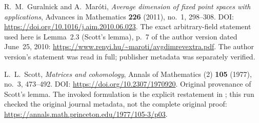 R.~M.~Guralnick and A.~Mar\'oti,
\emph{Average dimension of fixed point spaces with applications},
Advances in Mathematics \textbf{226} (2011), no.~1, 298--308.
DOI: \url{https://doi.org/10.1016/j.aim.2010.06.023}.
The exact arbitrary-field statement used here is Lemma~2.3
(Scott's lemma), p.~7 of the author version dated June~25, 2010:
\url{https://www.renyi.hu/~maroti/avgdimrevextra.pdf}.
The author version's statement was read in full; publisher metadata
was separately verified.

L.~L.~Scott,
\emph{Matrices and cohomology},
Annals of Mathematics (2) \textbf{105} (1977), no.~3, 473--492.
DOI: \url{https://doi.org/10.2307/1970920}.
Original provenance of Scott's lemma.  The invoked formulation is
the explicit restatement in \cite[Lemma~2.3]{TD:GuralnickMaroti2011};
this run checked the original journal metadata, not the complete
original proof:
\url{https://annals.math.princeton.edu/1977/105-3/p03}.
